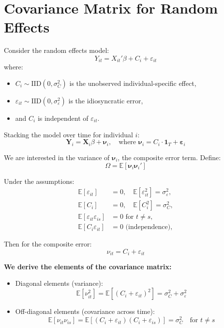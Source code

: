 \documentclass[12pt, oneside]{article}
\begin{document}
\section*{Covariance Matrix for Random Effects}

Consider the random effects model:
\[
Y_{it} = X_{it}'\beta + C_i + \varepsilon_{it}
\]
where:
\begin{itemize}
  \item \( C_i \sim \text{IID}(0, \sigma_C^2) \) is the unobserved individual-specific effect,
  \item \( \varepsilon_{it} \sim \text{IID}(0, \sigma_\varepsilon^2) \) is the idiosyncratic error,
  \item and \( C_i \) is independent of \( \varepsilon_{it} \).
\end{itemize}

Stacking the model over time for individual \( i \):
\[
\bm{Y}_i = \bm{X}_i \beta + \bm{\nu}_i, \quad \text{where } \bm{\nu}_i = C_i \cdot \bm{1}_T + \bm{\varepsilon}_i
\]

We are interested in the variance of \( \bm{\nu}_i \), the composite error term. Define:
\[
\Omega = \mathbb{E}[\bm{\nu}_i \bm{\nu}_i']
\]

Under the assumptions:
\begin{align*}
\mathbb{E}[\varepsilon_{it}] &= 0, \quad \mathbb{E}[\varepsilon_{it}^2] = \sigma_\varepsilon^2, \\
\mathbb{E}[C_i] &= 0, \quad \mathbb{E}[C_i^2] = \sigma_C^2, \\
\mathbb{E}[\varepsilon_{it} \varepsilon_{is}] &= 0 \text{ for } t \neq s, \\
\mathbb{E}[C_i \varepsilon_{it}] &= 0 \text{ (independence)},
\end{align*}

Then for the composite error:
\[
\nu_{it} = C_i + \varepsilon_{it}
\]

\textbf{We derive the elements of the covariance matrix:}

\begin{itemize}
  \item Diagonal elements (variance):
  \[
  \mathbb{E}[\nu_{it}^2] = \mathbb{E}[(C_i + \varepsilon_{it})^2] = \sigma_C^2 + \sigma_\varepsilon^2
  \]
  
  \item Off-diagonal elements (covariance across time):
  \[
  \mathbb{E}[\nu_{it} \nu_{is}] = \mathbb{E}[(C_i + \varepsilon_{it})(C_i + \varepsilon_{is})] = \sigma_C^2 \quad \text{for } t \ne s
  \]
\end{itemize}
\end{document}
